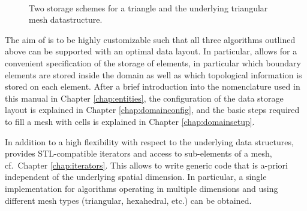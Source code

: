 \begin{figure}[bt]
 \centering
\mbox{
 \hspace{0.5cm}
 }
 \caption{Two storage schemes for a triangle and the underlying triangular mesh datastructure.}
 \label{fig:storage-schemes-triangle}
\end{figure}

The aim of {\ViennaGrid} is to be highly customizable such that all three algorithms outlined above can be supported with an optimal data layout. In particular, {\ViennaGrid} allows for a convenient specification of the storage of elements, in particular which boundary elements are stored inside the domain as well as which topological information is stored on each element. After a brief introduction into the nomenclature used in this manual in Chapter \ref{chap:entities}, the configuration of the data storage layout is explained in Chapter \ref{chap:domainconfig}, and the basic steps required to fill a mesh with cells is explained in Chapter \ref{chap:domainsetup}.

In addition to a high flexibility with respect to the underlying data structures, {\ViennaGrid} provides STL-compatible iterators and access to sub-elements of a mesh, cf.~Chapter \ref{chap:iterators}. This allows to write generic code that is a-priori independent of the underlying spatial dimension. In particular, a single implementation for algorithms operating in multiple dimensions and using different mesh types (triangular, hexahedral, etc.) can be obtained.

